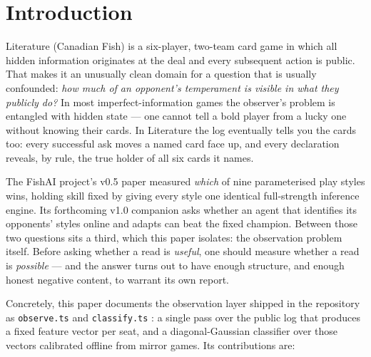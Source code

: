 \documentclass[11pt]{article}
\newcommand{\code}[1]{\texttt{#1}}
\begin{document}
\section{Introduction}
\label{sec:intro}

Literature (Canadian Fish) is a six-player, two-team card game in which all hidden information
originates at the deal and every subsequent action is public. That makes it an unusually clean
domain for a question that is usually confounded: \emph{how much of an opponent's temperament
is visible in what they publicly do?} In most imperfect-information games the observer's
problem is entangled with hidden state --- one cannot tell a bold player from a lucky one
without knowing their cards. In Literature the log eventually tells you the cards too: every
successful ask moves a named card face up, and every declaration reveals, by rule, the true
holder of all six cards it names.

The FishAI project's v0.5 paper \cite{v05} measured \emph{which} of nine parameterised play
styles wins, holding skill fixed by giving every style one identical full-strength inference
engine. Its forthcoming v1.0 companion \cite{v10} asks whether an agent that identifies its
opponents' styles online and adapts can beat the fixed champion. Between those two questions
sits a third, which this paper isolates: the observation problem itself. Before asking whether
a read is \emph{useful}, one should measure whether a read is \emph{possible} --- and the
answer turns out to have enough structure, and enough honest negative content, to warrant its
own report.

Concretely, this paper documents the observation layer shipped in the repository as
\code{observe.ts} and \code{classify.ts} \cite{repo}: a single pass over the public log that
produces a fixed feature vector per seat, and a diagonal-Gaussian classifier over those
vectors calibrated offline from mirror games. Its contributions are:
\end{document}

